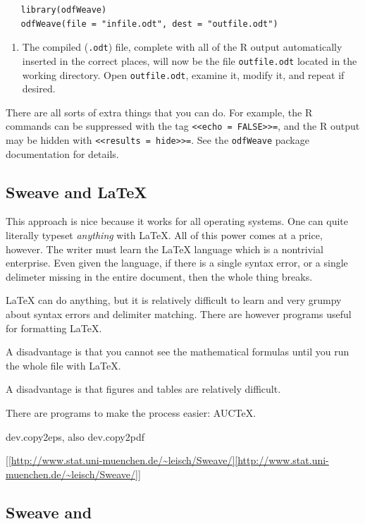 \documentclass[captions=tableheading]{scrbook}
\begin{document}
\begin{verbatim}
   library(odfWeave)
   odfWeave(file = "infile.odt", dest = "outfile.odt")
\end{verbatim}
\begin{enumerate}
\item The compiled (\texttt{.odt}) file, complete with all of the \textsf{R} output automatically inserted in the correct places, will now be the file \texttt{outfile.odt} located in the working directory. Open \texttt{outfile.odt}, examine it, modify it, and repeat if desired.
\end{enumerate}

There are all sorts of extra things that you can do. For example, the \textsf{R} commands can be suppressed with the tag \texttt{<\textcompwordmark{}<echo = FALSE>\textcompwordmark{}>=}, and the \textsf{R} output may be hidden with \texttt{<\textcompwordmark{}<results = hide>\textcompwordmark{}>=}. See the \texttt{odfWeave} package documentation for details.
\subsection{Sweave and \protect\LaTeX{}}
\label{sec-22-2-3}


This approach is nice because it works for all operating systems. One can quite literally typeset \emph{anything} with \LaTeX{}. All of this power comes at a price, however. The writer must learn the \LaTeX{} language which is a nontrivial enterprise. Even given the language, if there is a single syntax error, or a single delimeter missing in the entire document, then the whole thing breaks.

\LaTeX{} can do anything, but it is relatively difficult to learn  and very grumpy about syntax errors and delimiter matching. There are however programs useful for formatting \LaTeX{}.

A disadvantage is that you cannot see the mathematical formulas until you run the whole file with \LaTeX{}.

A disadvantage is that figures and tables are relatively difficult.

There are programs to make the process easier: AUC\TeX{}.

dev.copy2eps, also dev.copy2pdf

\url{[[http://www.stat.uni-muenchen.de/~leisch/Sweave/][http://www.stat.uni-muenchen.de/~leisch/Sweave/]]}
\subsection{Sweave and \protect\LyX{}}
\label{sec-22-2-4}
\end{document}
